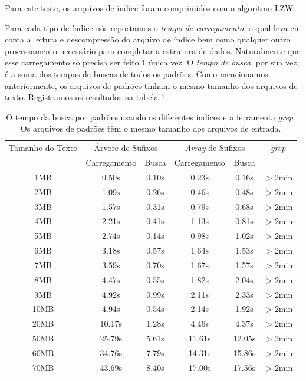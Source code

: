 \documentclass[]{article}
\begin{document}
Para este teste, os arquivos de índice foram comprimidos com o algoritmo LZW. 

Para cada tipo de índice nós reportamos o \textit{tempo de carregamento}, o qual leva em conta a leitura e descompressão do arquivo de índice bem como qualquer outro processamento necessário para completar a estrutura de dados. Naturalmente que esse carregamento só precisa ser feito 1 única vez. O \textit{tempo de busca}, por sua vez, é a soma dos tempos de buscas de todos os padrões. Como mencionamos anteriormente, os arquivos de padrões tinham o mesmo tamanho dos arquivos de texto. Registramos os resultados na tabela \ref{tab:t2}.

\begin{table}
	\begin{tabular}{c|c|c|c|c|c}
		Tamanho do Texto & \multicolumn{2}{c|}{Árvore de Sufixos} & \multicolumn{2}{c|}{\textit{Array} de Sufixos} & \textit{grep} \\
						 & 		Carregamento & Busca			  &			 Carregamento & Busca				   & \\
		\hline
            1MB &  0.50s  &  0.10s &  0.23s &  0.16s & $>$2min \\
            2MB &  1.09s  &  0.26s &  0.46s &  0.48s & $>$2min \\
            3MB &  1.57s  &  0.31s &  0.79s &  0.68s & $>$2min \\
            4MB &  2.21s  &  0.41s &  1.13s &  0.81s & $>$2min \\
            5MB &  2.74s  &  0.14s &  0.98s &  1.02s & $>$2min \\
            6MB &  3.18s  &  0.57s &  1.64s &  1.53s & $>$2min \\
            7MB &  3.59s  &  0.70s &  1.67s &  1.57s & $>$2min \\
            8MB &  4.47s  &  0.55s &  1.82s &  2.04s & $>$2min \\
            9MB &  4.92s  &  0.99s &  2.11s &  2.33s & $>$2min \\
           10MB &  4.94s  &  0.54s &  2.14s &  1.92s & $>$2min \\
           20MB & 10.17s  &  1.28s &  4.46s &  4.37s & $>$2min \\
           50MB & 25.79s  &  5.61s & 11.61s & 12.05s & $>$2min \\
           60MB & 34.76s  &  7.79s & 14.31s & 15.86s & $>$2min \\
           70MB & 43.69s  &  8.40s & 17.00s & 17.56s & $>$2min \\
	\end{tabular}
\caption{O tempo da busca por padrões usando os diferentes índices e a ferramenta \textit{grep}. Os arquivos de padrões têm o mesmo tamanho dos arquivos de entrada.}
\label{tab:t2}
\end{table}
\end{document}

